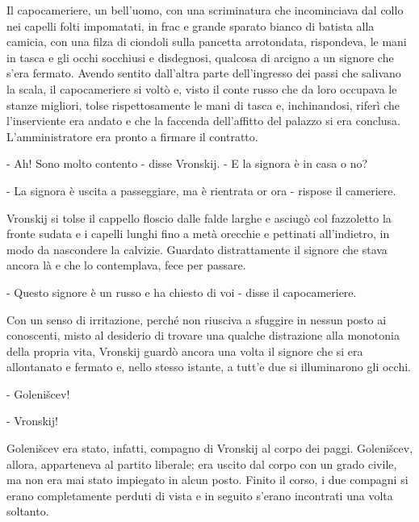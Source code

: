 Il capocameriere, un bell'uomo, con una scriminatura che incominciava dal collo nei capelli folti impomatati, in frac e grande sparato bianco di batista alla camicia, con una filza di ciondoli sulla pancetta arrotondata, rispondeva, le mani in tasca e gli occhi socchiusi e disdegnosi, qualcosa di arcigno a un signore che s'era fermato. Avendo sentito dall'altra parte dell'ingresso dei passi che salivano la scala, il capocameriere si voltò e, visto il conte russo che da loro occupava le stanze migliori, tolse rispettosamente le mani di tasca e, inchinandosi, riferì che l'inserviente era andato e che la faccenda dell'affitto del palazzo si era conclusa. L'amministratore era pronto a firmare il contratto. 

- Ah! Sono molto contento - disse Vronskij. - E la signora è in casa o no? 

- La signora è uscita a passeggiare, ma è rientrata or ora - rispose il cameriere. 

Vronskij si tolse il cappello floscio dalle falde larghe e asciugò col fazzoletto la fronte sudata e i capelli lunghi fino a metà orecchie e pettinati all'indietro, in modo da nascondere la calvizie. Guardato distrattamente il signore che stava ancora là e che lo contemplava, fece per passare. 

- Questo signore è un russo e ha chiesto di voi - disse il capocameriere. 

Con un senso di irritazione, perché non riusciva a sfuggire in nessun posto ai conoscenti, misto al desiderio di trovare una qualche distrazione alla monotonia della propria vita, Vronskij guardò ancora una volta il signore che si era allontanato e fermato e, nello stesso istante, a tutt'e due si illuminarono gli occhi. 

- Golenišcev! 

- Vronskij! 

Golenišcev era stato, infatti, compagno di Vronskij al corpo dei paggi. Golenišcev, allora, apparteneva al partito liberale; era uscito dal corpo con un grado civile, ma non era mai stato impiegato in alcun posto. Finito il corso, i due compagni si erano completamente perduti di vista e in seguito s'erano incontrati una volta soltanto. 


